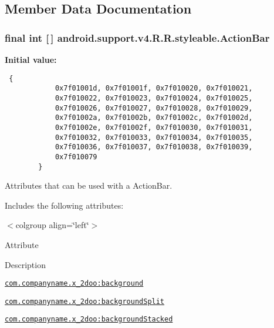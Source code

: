 \subsection{Member Data Documentation}
\hypertarget{classandroid_1_1support_1_1v4_1_1_r_1_1styleable_5c6cf2c83551ebae05f365bb913fdddf}{
\subsubsection[{ActionBar}]{\setlength{\rightskip}{0pt plus 5cm}final int \mbox{[}$\,$\mbox{]} android.support.v4.R.R.styleable.ActionBar}}
\label{classandroid_1_1support_1_1v4_1_1_r_1_1styleable_5c6cf2c83551ebae05f365bb913fdddf}


\textbf{Initial value:}

\begin{Code}\begin{verbatim} {
            0x7f01001d, 0x7f01001f, 0x7f010020, 0x7f010021,
            0x7f010022, 0x7f010023, 0x7f010024, 0x7f010025,
            0x7f010026, 0x7f010027, 0x7f010028, 0x7f010029,
            0x7f01002a, 0x7f01002b, 0x7f01002c, 0x7f01002d,
            0x7f01002e, 0x7f01002f, 0x7f010030, 0x7f010031,
            0x7f010032, 0x7f010033, 0x7f010034, 0x7f010035,
            0x7f010036, 0x7f010037, 0x7f010038, 0x7f010039,
            0x7f010079
        }
\end{verbatim}
\end{Code}
Attributes that can be used with a ActionBar. 

Includes the following attributes: \begin{TabularC}{0}
\hline
\end{TabularC}
$<$colgroup align=\char`\"{}left\char`\"{}$>$ 

Attribute

Description 

{\tt \hyperlink{classandroid_1_1support_1_1v4_1_1_r_1_1styleable_7d91fb5bbb5c3d2bc5aec28f9ed002b4}{com.companyname.x\_\-2doo:background}}

{\tt \hyperlink{classandroid_1_1support_1_1v4_1_1_r_1_1styleable_94fcfd07399863e568786b26bbb3deed}{com.companyname.x\_\-2doo:backgroundSplit}}

{\tt \hyperlink{classandroid_1_1support_1_1v4_1_1_r_1_1styleable_afd1ae650dce54259899787ed8768401}{com.companyname.x\_\-2doo:backgroundStacked}}

